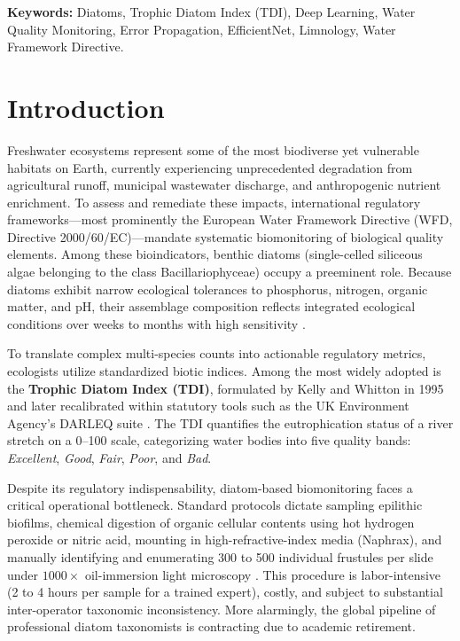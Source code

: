 \documentclass[10pt,twocolumn,a4paper]{article}
\begin{document}
\textbf{Keywords:} Diatoms, Trophic Diatom Index (TDI), Deep Learning, Water Quality Monitoring, Error Propagation, EfficientNet, Limnology, Water Framework Directive.

\section{Introduction}

Freshwater ecosystems represent some of the most biodiverse yet vulnerable habitats on Earth, currently experiencing unprecedented degradation from agricultural runoff, municipal wastewater discharge, and anthropogenic nutrient enrichment. To assess and remediate these impacts, international regulatory frameworks---most prominently the European Water Framework Directive (WFD, Directive 2000/60/EC)---mandate systematic biomonitoring of biological quality elements. Among these bioindicators, benthic diatoms (single-celled siliceous algae belonging to the class Bacillariophyceae) occupy a preeminent role. Because diatoms exhibit narrow ecological tolerances to phosphorus, nitrogen, organic matter, and pH, their assemblage composition reflects integrated ecological conditions over weeks to months with high sensitivity \cite{round1991diatoms, kelly1995trophic}.

To translate complex multi-species counts into actionable regulatory metrics, ecologists utilize standardized biotic indices. Among the most widely adopted is the \textbf{Trophic Diatom Index (TDI)}, formulated by Kelly and Whitton in 1995 \cite{kelly1995trophic} and later recalibrated within statutory tools such as the UK Environment Agency's DARLEQ suite \cite{kelly2008assessment}. The TDI quantifies the eutrophication status of a river stretch on a 0--100 scale, categorizing water bodies into five quality bands: \textit{Excellent}, \textit{Good}, \textit{Fair}, \textit{Poor}, and \textit{Bad}.

Despite its regulatory indispensability, diatom-based biomonitoring faces a critical operational bottleneck. Standard protocols dictate sampling epilithic biofilms, chemical digestion of organic cellular contents using hot hydrogen peroxide or nitric acid, mounting in high-refractive-index media (Naphrax), and manually identifying and enumerating 300 to 500 individual frustules per slide under $1000\times$ oil-immersion light microscopy \cite{kelly2008assessment}. This procedure is labor-intensive (2 to 4 hours per sample for a trained expert), costly, and subject to substantial inter-operator taxonomic inconsistency. More alarmingly, the global pipeline of professional diatom taxonomists is contracting due to academic retirement.
\end{document}
